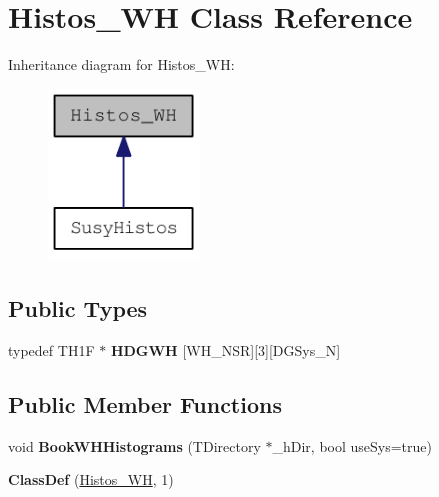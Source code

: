 \hypertarget{classHistos__WH}{
\section{Histos\_\-WH Class Reference}
\label{classHistos__WH}
}
Inheritance diagram for Histos\_\-WH:\nopagebreak
\begin{figure}[H]
\begin{center}
\leavevmode
\includegraphics[width=114pt]{classHistos__WH__inherit__graph}
\end{center}
\end{figure}
\subsection*{Public Types}
\begin{DoxyCompactItemize}
\item 
\hypertarget{classHistos__WH_ab6f0f1c5fb37e2110a77c90f6069a0ab}{
typedef TH1F $\ast$ {\bfseries HDGWH} \mbox{[}WH\_\-NSR\mbox{]}\mbox{[}3\mbox{]}\mbox{[}DGSys\_\-N\mbox{]}}
\label{classHistos__WH_ab6f0f1c5fb37e2110a77c90f6069a0ab}

\end{DoxyCompactItemize}
\subsection*{Public Member Functions}
\begin{DoxyCompactItemize}
\item 
\hypertarget{classHistos__WH_afdd4095ad5a9266c7b99aefc25fd0415}{
void {\bfseries BookWHHistograms} (TDirectory $\ast$\_\-hDir, bool useSys=true)}
\label{classHistos__WH_afdd4095ad5a9266c7b99aefc25fd0415}

\item 
\hypertarget{classHistos__WH_a798824da17967b13857282ae8eacbc53}{
{\bfseries ClassDef} (\hyperlink{classHistos__WH}{Histos\_\-WH}, 1)}
\label{classHistos__WH_a798824da17967b13857282ae8eacbc53}

\end{DoxyCompactItemize}

